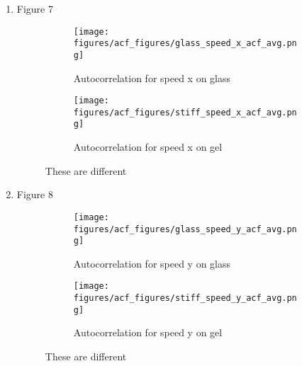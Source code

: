 \documentclass[12pt]{article}
\begin{document}
\begin{enumerate}
\item Figure 7
\begin{figure}[h!]
    \centering
    \begin{subfigure}[b]{0.4\linewidth}
      \texttt{[image: figures/acf\_figures/glass\_speed\_x\_acf\_avg.png]}
      \caption{Autocorrelation for speed x on glass}
    \end{subfigure}
    \begin{subfigure}[b]{0.4\linewidth}
      \texttt{[image: figures/acf\_figures/stiff\_speed\_x\_acf\_avg.png]}
      \caption{Autocorrelation for speed x on gel}
    \end{subfigure}
    \caption{These are different}
    \label{fig:acf_speedx}
  \end{figure}

\item Figure 8
\begin{figure}[h!]
    \centering
    \begin{subfigure}[b]{0.4\linewidth}
      \texttt{[image: figures/acf\_figures/glass\_speed\_y\_acf\_avg.png]}
      \caption{Autocorrelation for speed y on glass}
    \end{subfigure}
    \begin{subfigure}[b]{0.4\linewidth}
      \texttt{[image: figures/acf\_figures/stiff\_speed\_y\_acf\_avg.png]}
      \caption{Autocorrelation for speed y on gel}
    \end{subfigure}
    \caption{These are different}
    \label{fig:acf_speedy}
  \end{figure}

\end{enumerate}
\end{document}
